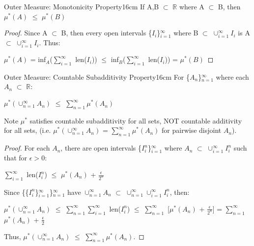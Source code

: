     \vspace{0.5cm}



    \begin{wtheorem}{Outer Measure: Monotonicity Property}{16cm}
        If A,B $\subset$ $\mathbb{R}$ where A $\subset$ B, then
        $\mu^*(A)$ $\leq$ $\mu^*(B)$
    \end{wtheorem}

    \begin{proof}
        Since A $\subset$ B, then every open intervals \{$I_i$\}$_{i=1}^{\infty}$
        where B $\subset$ $\cup_{i=1}^{\infty} I_i$
        is A $\subset$ $\cup_{i=1}^{\infty} I_i$. Thus:

        \hspace{0.5cm}
        $\mu^*(A)$
        = inf$_A$($\sum_{i=1}^{\infty}$ len($I_i$))
        $\leq$ inf$_B$($\sum_{i=1}^{\infty}$ len($I_i$))
        = $\mu^*(B)$
    \end{proof}

    \newpage



    \begin{wtheorem}{Outer Measure: Countable Subadditivity Property}{16cm}
        For \{$A_n$\}$_{n=1}^{\infty}$ where each $A_n$ $\subset$ $\mathbb{R}$:

        \hspace{0.5cm}
        $\mu^*(\cup_{n=1}^{\infty} A_n)$
        $\leq$ $\sum_{n=1}^{\infty} \mu^*(A_n)$

        Note $\mu^*$ satisfies countable subadditivity for all sets, NOT countable
        additivity for all sets, (i.e. $\mu^*(\cup_{n=1}^{\infty} A_n)$
        = $\sum_{n=1}^{\infty} \mu^*(A_n)$ for pairwise disjoint $A_n$).
    \end{wtheorem}

    \begin{proof}
        For each $A_n$, there are open intervals \{$I_i^n$\}$_{i=1}^{\infty}$
        where $A_n$ $\subset$ $\cup_{i=1}^{\infty} I_i^n$ such that
        for $\epsilon > 0$:

        \hspace{0.5cm}
        $\sum_{i=1}^{\infty}$ len($I_i^n$)
        $\leq$ $\mu^*(A_n)$ + $\frac{\epsilon}{2^n}$

        Since \{\{$I_i^n$\}$_{i=1}^{\infty}$\}$_{n=1}^{\infty}$
        have $\cup_{n=1}^{\infty} A_n$
        $\subset$ $\cup_{n=1}^{\infty} \cup_{i=1}^{\infty} I_i^n$, then:

        \hspace{0.5cm}
        $\mu^*(\cup_{n=1}^{\infty} A_n)$
        $\leq$ $\sum_{n=1}^{\infty} \sum_{i=1}^{\infty}$ len($I_i^n$)
        $\leq$ $\sum_{n=1}^{\infty}$ [$\mu^*(A_n)$ + $\frac{\epsilon}{2^n}$]
        = $\sum_{n=1}^{\infty}$ $\mu^*(A_n)$ + $\frac{\epsilon}{2}$

        Thus, $\mu^*(\cup_{n=1}^{\infty} A_n)$
        $\leq$ $\sum_{n=1}^{\infty} \mu^*(A_n)$.
    \end{proof}

